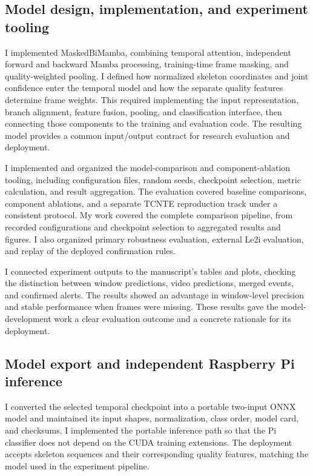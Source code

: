 \documentclass[conference,a4paper]{IEEEtran}
\begin{document}
\subsection{Model design, implementation, and experiment tooling}

I implemented MaskedBiMamba, combining temporal attention, independent forward and backward Mamba processing, training-time frame masking, and quality-weighted pooling. I defined how normalized skeleton coordinates and joint confidence enter the temporal model and how the separate quality features determine frame weights. This required implementing the input representation, branch alignment, feature fusion, pooling, and classification interface, then connecting those components to the training and evaluation code. The resulting model provides a common input/output contract for research evaluation and deployment.

I implemented and organized the model-comparison and component-ablation tooling, including configuration files, random seeds, checkpoint selection, metric calculation, and result aggregation. The evaluation covered baseline comparisons, component ablations, and a separate TCNTE reproduction track under a consistent protocol. My work covered the complete comparison pipeline, from recorded configurations and checkpoint selection to aggregated results and figures. I also organized primary robustness evaluation, external Le2i evaluation, and replay of the deployed confirmation rules.

I connected experiment outputs to the manuscript's tables and plots, checking the distinction between window predictions, video predictions, merged events, and confirmed alerts. The results showed an advantage in window-level precision and stable performance when frames were missing. These results gave the model-development work a clear evaluation outcome and a concrete rationale for its deployment.

\subsection{Model export and independent Raspberry Pi inference}

I converted the selected temporal checkpoint into a portable two-input ONNX model and maintained its input shapes, normalization, class order, model card, and checksums. I implemented the portable inference path so that the Pi classifier does not depend on the CUDA training extensions. The deployment accepts skeleton sequences and their corresponding quality features, matching the model used in the experiment pipeline.
\end{document}

